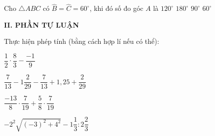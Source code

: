 \begin{ex}%
	Cho $\triangle ABC$ có $\widehat B=\widehat C=60^\circ$, khi đó số đo góc $A$ là
	\choice
	{$120^\circ$}
	{$180^\circ$}
	{$90^\circ$}
	{\True $60^\circ$}
	\loigiai{
	}
\end{ex}
\noindent\textbf{II. PHẦN TỰ LUẬN}
\setcounter{ex}{0}
\begin{ex}%
	Thực hiện phép tính (bằng cách hợp lí nếu có thể):
	\begin{listEX}[2]
		\item $\dfrac{1}{2} \cdot \dfrac{8}{3}-\dfrac{-1}{9}$
		\item $\dfrac{7}{13}-1\dfrac{2}{29}-\dfrac{7}{13}+1,25+\dfrac{2}{29}$
		\item $\dfrac{-13}{8} \cdot \dfrac{7}{19}+\dfrac{5}{8} \cdot \dfrac{7}{19}$
		\item $-2^2\sqrt{(-3)^2+4^2}-1\dfrac{1}{3}:2\dfrac{2}{3}$
	\end{listEX}
\end{ex}
